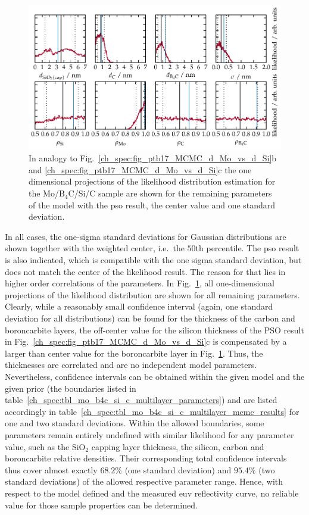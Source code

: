 \begin{figure}[htbp]
\centering
\includegraphics{img/PTB17_MCMC_other_params}
\caption{In analogy to Fig.~\ref{ch_spec:fig_ptb17_MCMC_d_Mo_vs_d_Si}b and \ref{ch_spec:fig_ptb17_MCMC_d_Mo_vs_d_Si}c the one dimensional projections of the likelihood distribution estimation for the Mo/B$_4$C/Si/C sample are shown for the remaining parameters of the model with the \gls{pso} result, the center value and one standard deviation.}
\label{ch_spec:fig_ptb17_MCMC_other_params}
\end{figure}
In all cases, the one-sigma standard deviations for Gaussian distributions are shown together with the weighted center, i.e.~the $50$th percentile. The \gls{pso} result is also indicated, which is compatible with the one sigma standard deviation, but does not match the center of the likelihood result. The reason for that lies in higher order correlations of the parameters. In Fig.~\ref{ch_spec:fig_ptb17_MCMC_other_params}, all one-dimensional projections of the likelihood distribution are shown for all remaining parameters. Clearly, while a reasonably small confidence interval (again, one standard deviation for all distributions) can be found for the thickness of the carbon and boroncarbite layers, the off-center value for the silicon thickness of the PSO result in Fig.~\ref{ch_spec:fig_ptb17_MCMC_d_Mo_vs_d_Si}c is compensated by a larger than center value for the boroncarbite layer in Fig.~\ref{ch_spec:fig_ptb17_MCMC_other_params}. Thus, the thicknesses are correlated and are no independent model parameters. Nevertheless, confidence intervals can be obtained within the given model and the given prior (the boundaries listed in table~\ref{ch_spec:tbl_mo_b4c_si_c_multilayer_parameters}) and are listed accordingly in table~\ref{ch_spec:tbl_mo_b4c_si_c_multilayer_mcmc_results} for one and two standard deviations. Within the allowed boundaries, some parameters remain entirely undefined with similar likelihood for any parameter value, such as the SiO$_2$ capping layer thickness, the silicon, carbon and boroncarbite relative densities. Their corresponding total confidence intervals thus cover almost exactly $68.2\%$ (one standard deviation) and $95.4\%$ (two standard deviations) of the allowed respective parameter range. Hence, with respect to the model defined and the measured \gls{euv} reflectivity curve, no reliable value for those sample properties can be determined.

